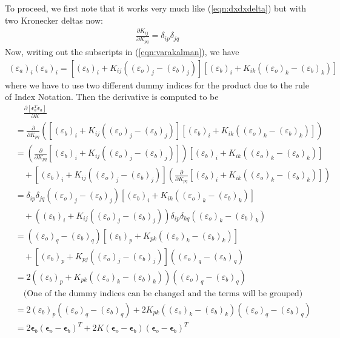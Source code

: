 To proceed, we first note that it works very much like (\ref{eqn:dxdxdelta}) but with two Kronecker deltas now:
\begin{align}
\frac{\partial K_{ij}}{\partial K_{pq}} = \delta_{ip}\delta_{jq}
\end{align}
Now, writing out the subscripts in (\ref{eqn:varakalman}), we have
\begin{align}
(\varepsilon_a)_i(\varepsilon_a)_i = [(\varepsilon_b)_i + K_{ij}((\varepsilon_o)_j - (\varepsilon_b)_j)][(\varepsilon_b)_i + K_{ik}((\varepsilon_o)_k - (\varepsilon_b)_k)]
\end{align}
where we have to use two different dummy indices for the product due to the rule of Index Notation. Then the derivative is computed to be
\begin{align}
&\quad \frac{\partial [\bm{\epsilon}_a^T\bm{\epsilon}_a]}{\partial K} \nonumber \\
&= \frac{\partial}{\partial K_{pq}}\left([(\varepsilon_b)_i + K_{ij}((\varepsilon_o)_j - (\varepsilon_b)_j)][(\varepsilon_b)_i + K_{ik}((\varepsilon_o)_k - (\varepsilon_b)_k)]\right) \nonumber \\
&= \left(\frac{\partial}{\partial K_{pq}}[(\varepsilon_b)_i + K_{ij}((\varepsilon_o)_j - (\varepsilon_b)_j)]\right)[(\varepsilon_b)_i + K_{ik}((\varepsilon_o)_k - (\varepsilon_b)_k)] \nonumber \\
&\quad +[(\varepsilon_b)_i + K_{ij}((\varepsilon_o)_j - (\varepsilon_b)_j)] \left(\frac{\partial}{\partial K_{pq}}[(\varepsilon_b)_i + K_{ik}((\varepsilon_o)_k - (\varepsilon_b)_k)]\right) \nonumber \\
&= \delta_{ip}\delta_{jq}((\varepsilon_o)_j - (\varepsilon_b)_j)[(\varepsilon_b)_i + K_{ik}((\varepsilon_o)_k - (\varepsilon_b)_k)] \nonumber \\
&\quad + ((\varepsilon_b)_i + K_{ij}((\varepsilon_o)_j - (\varepsilon_b)_j)) \delta_{ip}\delta_{kq} ((\varepsilon_o)_k - (\varepsilon_b)_k) \nonumber \\
&= ((\varepsilon_o)_q - (\varepsilon_b)_q)[(\varepsilon_b)_p + K_{pk}((\varepsilon_o)_k - (\varepsilon_b)_k)] \nonumber \\
&\quad + [(\varepsilon_b)_p + K_{pj}((\varepsilon_o)_j - (\varepsilon_b)_j)] ((\varepsilon_o)_q - (\varepsilon_b)_q) \nonumber \\
&= 2((\varepsilon_b)_p + K_{pk}((\varepsilon_o)_k - (\varepsilon_b)_k)) ((\varepsilon_o)_q - (\varepsilon_b)_q) \nonumber \\
&\quad \text{(One of the dummy indices can be changed and the terms will be grouped)} \nonumber \\
&= 2(\varepsilon_b)_p ((\varepsilon_o)_q - (\varepsilon_b)_q) + 2 K_{pk}((\varepsilon_o)_k - (\varepsilon_b)_k)((\varepsilon_o)_q - (\varepsilon_b)_q) \nonumber \\
&= 2 \bm{\epsilon}_b (\bm{\epsilon}_o - \bm{\epsilon}_b)^T + 2K(\bm{\epsilon}_o - \bm{\epsilon}_b)(\bm{\epsilon}_o - \bm{\epsilon}_b)^T \label{eqn:Kalmande0res}
\end{align}
